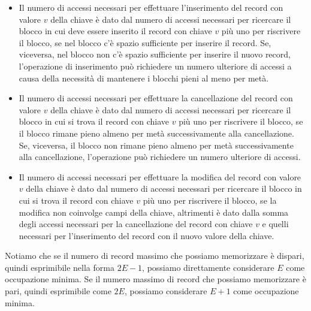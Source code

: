 \begin{itemize}
    \item Il numero di accessi necessari per effettuare l'inserimento del record con valore $v$ della chiave è dato dal numero di accessi necessari per ricercare il blocco in cui deve essere inserito il record con chiave $v$ più uno per riscrivere il blocco, se nel blocco c'è spazio sufficiente per inserire il record. Se, viceversa, nel blocco non c'è spazio sufficiente per inserire il nuovo record, l'operazione di inserimento può richiedere un numero ulteriore di accessi a causa della necessità di mantenere i blocchi pieni al meno per metà.

    \item Il numero di accessi necessari per effettuare la cancellazione del record con valore $v$ della chiave è dato dal numero di accessi necessari per ricercare il blocco in cui si trova il record con chiave $v$ più uno per riscrivere il blocco, se il blocco rimane pieno almeno per metà successivamente alla cancellazione. Se, viceversa, il blocco non rimane pieno almeno per metà successivamente alla cancellazione, l'operazione può richiedere un numero ulteriore di accessi.

    \item Il numero di accessi necessari per effettuare la modifica del record con valore $v$ della chiave è dato dal numero di accessi necessari per ricercare il blocco in cui si trova il record con chiave $v$ più uno per riscrivere il blocco, se la modifica non coinvolge campi della chiave, altrimenti è dato dalla somma degli accessi necessari per la cancellazione del record con chiave $v$ e quelli necessari per l'inserimento del record con il nuovo valore della chiave.
\end{itemize}

Notiamo che se il numero di record massimo che possiamo memorizzare è dispari, quindi esprimibile nella forma $2E-1$, possiamo direttamente considerare $E$ come occupazione  minima. Se il numero massimo di record che possiamo memorizzare è pari, quindi esprimibile come $2E$, possiamo considerare $E+1$ come occupazione minima.

